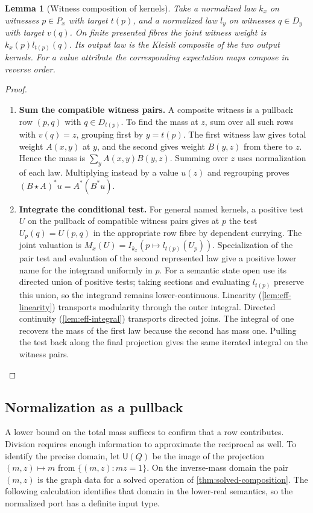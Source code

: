 \documentclass[11pt,a4paper]{article}
\newtheorem{lemma}[lemma]{Lemma}
\theoremstyle{definition}
\theoremstyle{remark}\newaliascnt{remark}{theorem}
\numberwithin{equation}{section}
\begin{document}
\begin{lemma}[Witness composition of kernels]\label{lem:stoch}
Take a normalized law \(k_x\) on witnesses \(p\in P_x\) with target \(t(p)\), and a normalized law \(l_y\) on witnesses \(q\in D_y\) with target \(v(q)\). On finite presented fibres the joint witness weight is \(k_x(p)l_{t(p)}(q)\). Its output law is the Kleisli composite of the two output kernels. For a value attribute the corresponding expectation maps compose in reverse order.
\end{lemma}
\begin{proof}\leavevmode
\begin{enumerate}[titledsteps]
    \item \textbf{Sum the compatible witness pairs.} A composite witness is a pullback row $(p,q)$ with $q\in D_{t(p)}$. To find the mass at $z$, sum over all such rows with $v(q)=z$, grouping first by $y=t(p)$. The first witness law gives total weight $A(x,y)$ at $y$, and the second gives weight $B(y,z)$ from there to $z$. Hence the mass is $\sum_y A(x,y)B(y,z)$. Summing over $z$ uses normalization of each law. Multiplying instead by a value $u(z)$ and regrouping proves $(B\star A)^*u=A^*(B^*u)$.


    \item \textbf{Integrate the conditional test.} For general named kernels, a positive test $U$ on the pullback of compatible witness pairs gives at $p$ the test $U_p(q)=U(p,q)$ in the appropriate row fibre by dependent currying. The joint valuation is $M_x(U)=I_{k_x}(p\mapsto l_{t(p)}(U_p))$. Specialization of the pair test and evaluation of the second represented law give a positive lower name for the integrand uniformly in $p$. For a semantic state open use its directed union of positive tests; taking sections and evaluating $l_{t(p)}$ preserve this union, so the integrand remains lower-continuous. Linearity (\cref{lem:eff-linearity}) transports modularity through the outer integral. Directed continuity (\cref{lem:eff-integral}) transports directed joins. The integral of one recovers the mass of the first law because the second has mass one. Pulling the test back along the final projection gives the same iterated integral on the witness pairs.\qedhere
\end{enumerate}
\end{proof}

\subsection{Normalization as a pullback}
A lower bound on the total mass suffices to confirm that a row contributes. Division requires enough information to approximate the reciprocal as well. To identify the precise domain, let $\mathsf U(Q)$ be the image of the projection $(m,z)\mapsto m$ from $\{(m,z):mz=1\}$.
On the inverse-mass domain the pair \((m,z)\) is the graph data for a solved operation of \cref{thm:solved-composition}. The following calculation identifies that domain in the lower-real semantics, so the normalized port has a definite input type.
\end{document}
